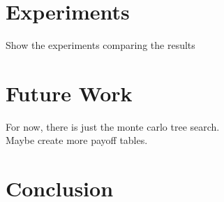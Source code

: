 \documentclass[10pt]{article}
\begin{document}
\section{Experiments}
Show the experiments comparing the results 



\section{Future Work}
For now, there is just the monte carlo tree search.\\
Maybe create more payoff tables.



\section{Conclusion}
\end{document}
